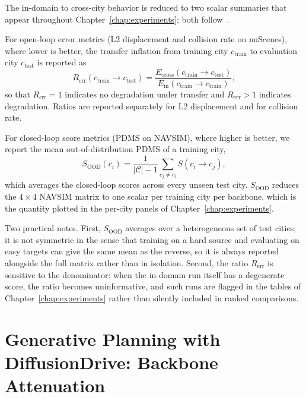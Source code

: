 The in-domain to cross-city behavior is reduced to two scalar summaries that appear throughout Chapter~\ref{chap:experiments}; both follow~\cite{naeinian-cross-city-2026}.

For open-loop error metrics (L2 displacement and collision rate on nuScenes), where lower is better, the transfer inflation from training city \(c_\text{train}\) to evaluation city \(c_\text{test}\) is reported as
\begin{equation}
\label{eq:meth-rerr}
R_\text{err}(c_\text{train} \to c_\text{test})
=
\frac{E_\text{cross}(c_\text{train} \to c_\text{test})}
     {E_\text{in}(c_\text{train} \to c_\text{train})},
\end{equation}
so that \(R_\text{err}=1\) indicates no degradation under transfer and \(R_\text{err}>1\) indicates degradation. Ratios are reported separately for L2 displacement and for collision rate.

For closed-loop score metrics (PDMS on NAVSIM), where higher is better, we report the mean out-of-distribution PDMS of a training city,
\begin{equation}
\label{eq:meth-sood}
S_\text{OOD}(c_i)
=
\frac{1}{|\mathcal{C}|-1}
\sum_{c_j \neq c_i} S(c_i \to c_j),
\end{equation}
which averages the closed-loop scores across every unseen test city. \(S_\text{OOD}\) reduces the \(4\times 4\) NAVSIM matrix to one scalar per training city per backbone, which is the quantity plotted in the per-city panels of Chapter~\ref{chap:experiments}.

Two practical notes. First, \(S_\text{OOD}\) averages over a heterogeneous set of test cities; it is not symmetric in the sense that training on a hard source and evaluating on easy targets can give the same mean as the reverse, so it is always reported alongside the full matrix rather than in isolation. Second, the ratio \(R_\text{err}\) is sensitive to the denominator: when the in-domain run itself has a degenerate score, the ratio becomes uninformative, and such runs are flagged in the tables of Chapter~\ref{chap:experiments} rather than silently included in ranked comparisons.

\section{Generative Planning with DiffusionDrive: Backbone Attenuation}
\label{sec:meth-diffusiondrive}

